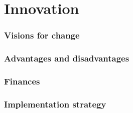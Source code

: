 \part{Innovation}


\section{Visions for change}

\section{Advantages and disadvantages}

\section{Finances}

\section{Implementation strategy}


